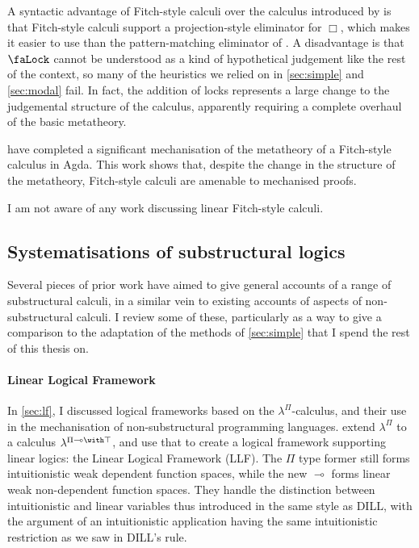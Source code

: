 A syntactic advantage of Fitch-style calculi over the calculus introduced by
\citet{judgmental} is that Fitch-style calculi support a projection-style
eliminator for $\Box$, which makes it easier to use than the pattern-matching
eliminator of \citeauthor{judgmental}.
A disadvantage is that $\Lock$ cannot be understood as a kind of hypothetical
judgement like the rest of the context, so many of the heuristics we relied on
in \cref{sec:simple} and \cref{sec:modal} fail.
In fact, the addition of locks represents a large change to the judgemental
structure of the calculus, apparently requiring a complete overhaul of the basic
metatheory.

 have completed a significant mechanisation of the metatheory of
a Fitch-style calculus in Agda.
This work shows that, despite the change in the structure of the metatheory,
Fitch-style calculi are amenable to mechanised proofs.

I am not aware of any work discussing linear Fitch-style calculi.

\subsection{Systematisations of substructural logics}

Several pieces of prior work have aimed to give general accounts of a range of
substructural calculi, in a similar vein to existing accounts of aspects of
non-substructural calculi.
I review some of these, particularly as a way to give a comparison to the
adaptation of the methods of \cref{sec:simple} that I spend the rest of this
thesis on.

\paragraph{Linear Logical Framework}
In \cref{sec:lf}, I discussed logical frameworks based on the
$\lambda^\Pi$-calculus, and their use in the mechanisation of non-substructural
programming languages.
 extend $\lambda^\Pi$ to a calculus
$\lambda^{\Pi\multimap\with\top}$, and use that to create a logical framework
supporting linear logics: the Linear Logical Framework (LLF).
The $\Pi$ type former still forms intuitionistic weak dependent function spaces,
while the new $\multimap$ forms linear weak non-dependent function spaces.
They handle the distinction between intuitionistic and linear variables thus
introduced in the same style as DILL, with the argument of an intuitionistic
application having the same intuitionistic restriction as we saw in DILL's
 rule.

